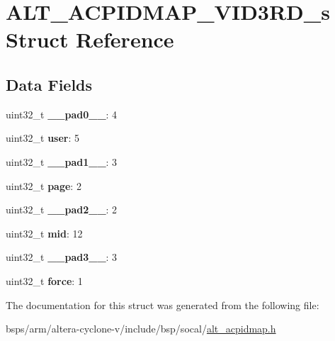 \hypertarget{structALT__ACPIDMAP__VID3RD__s}{}\section{A\+L\+T\+\_\+\+A\+C\+P\+I\+D\+M\+A\+P\+\_\+\+V\+I\+D3\+R\+D\+\_\+s Struct Reference}
\label{structALT__ACPIDMAP__VID3RD__s}
\subsection*{Data Fields}
\begin{DoxyCompactItemize}
\item 
\mbox{\label{structALT__ACPIDMAP__VID3RD__s_ac840106fd1c69a5b6f17a664469d6cee}} 
uint32\+\_\+t {\bfseries \+\_\+\+\_\+pad0\+\_\+\+\_\+}\+: 4
\item 
\mbox{\label{structALT__ACPIDMAP__VID3RD__s_a2b36d4b12eb9be708e1862871344f5cb}} 
uint32\+\_\+t {\bfseries user}\+: 5
\item 
\mbox{\label{structALT__ACPIDMAP__VID3RD__s_a1fc6af782723ac67f480c8b7ae699019}} 
uint32\+\_\+t {\bfseries \+\_\+\+\_\+pad1\+\_\+\+\_\+}\+: 3
\item 
\mbox{\label{structALT__ACPIDMAP__VID3RD__s_a33a1ce0a38f9ff45926fae6db5ecb9c0}} 
uint32\+\_\+t {\bfseries page}\+: 2
\item 
\mbox{\label{structALT__ACPIDMAP__VID3RD__s_aa48cbbb2b0def7053e04ddd1be7dbb26}} 
uint32\+\_\+t {\bfseries \+\_\+\+\_\+pad2\+\_\+\+\_\+}\+: 2
\item 
\mbox{\label{structALT__ACPIDMAP__VID3RD__s_a1303ee9e97fc710d420200280983717c}} 
uint32\+\_\+t {\bfseries mid}\+: 12
\item 
\mbox{\label{structALT__ACPIDMAP__VID3RD__s_a6b9711000e28620eefd26d07779b5347}} 
uint32\+\_\+t {\bfseries \+\_\+\+\_\+pad3\+\_\+\+\_\+}\+: 3
\item 
\mbox{\label{structALT__ACPIDMAP__VID3RD__s_ad098f8cb9d46a71b0522f59694ad448f}} 
uint32\+\_\+t {\bfseries force}\+: 1
\end{DoxyCompactItemize}


The documentation for this struct was generated from the following file\+:\begin{DoxyCompactItemize}
\item 
bsps/arm/altera-\/cyclone-\/v/include/bsp/socal/\mbox{\hyperlink{alt__acpidmap_8h}{alt\+\_\+acpidmap.\+h}}\end{DoxyCompactItemize}
